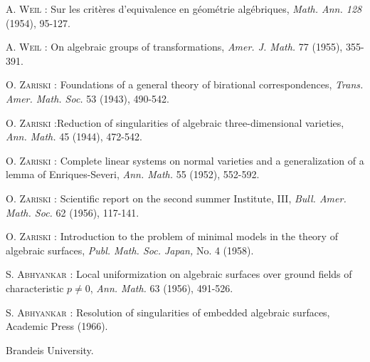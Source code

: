 \begin{thebibliography}{99}
 \textsc{A. Weil :} Sur les crit\`eres d'equivalence en g\'eom\'etrie alg\'ebriques, {\em Math. Ann. 128} (1954), 95-127.

 \textsc{A. Weil :} On algebraic groups of transformations, {\em Amer. J. Math.} 77 (1955), 355-391.

 \textsc{O. Zariski :} Foundations of a general theory of birational correspondences, {\em Trans. Amer. Math. Soc.} 53 (1943), 490-542.

 \textsc{O. Zariski :}\pageoriginale Reduction of singularities of algebraic three-dimensional varieties, {\em Ann. Math.} 45 (1944), 472-542.

 \textsc{O. Zariski :} Complete linear systems on normal varieties and a generalization of a lemma of Enriques-Severi, {\em Ann. Math.} 55 (1952), 552-592.

 \textsc{O. Zariski :} Scientific report on the second summer Institute, III, {\em Bull. Amer. Math. Soc.} 62 (1956), 117-141.

 \textsc{O. Zariski :} Introduction to the problem of minimal models in the theory of algebraic surfaces, {\em Publ. Math. Soc. Japan,} No. 4 (1958).

 \textsc{S. Abhyankar :} Local uniformization on algebraic surfaces over ground fields of characteristic $p\neq 0$, {\em Ann. Math.} 63 (1956), 491-526.

 \textsc{S. Abhyankar :} {\rm Resolution of singularities of embedded algebraic surfaces,} Academic Press (1966).

\end{thebibliography}

\bigskip
\noindent
{\small Brandeis University.}
